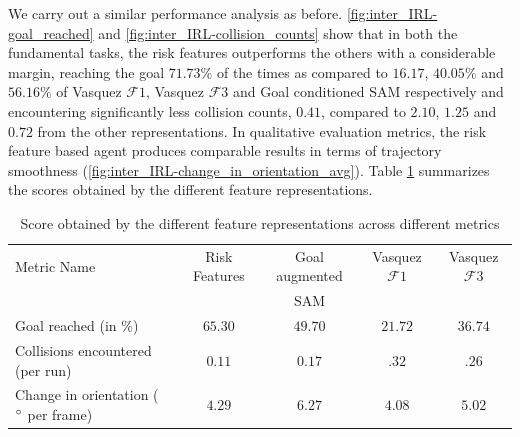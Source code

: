 We carry out a similar performance analysis as before. \autoref{fig:inter_IRL-goal_reached} and \autoref{fig:inter_IRL-collision_counts} show that in both the fundamental tasks, the risk features outperforms the others with a considerable margin, reaching the goal $71.73\%$ of the times as compared to $16.17$, $40.05\%$ and $56.16\%$ of Vasquez $\mathcal{F}1$, Vasquez $\mathcal{F}3$ and Goal conditioned SAM respectively and encountering significantly less collision counts, $0.41$, compared to $2.10$, $1.25$ and $0.72$ from the other  representations. In qualitative evaluation metrics, the risk feature based agent produces comparable results in terms of trajectory smoothness (\autoref{fig:inter_IRL-change_in_orientation_avg}). %
Table \ref{tab:inter_irl_numerical_comparison} summarizes the scores obtained by the different feature representations.
\begin{table}[htbp]
	\begin{center}
		\renewcommand{\arraystretch}{1.5}
		\begin{tabular}{|p{2.5cm}|c|c|c|c|}
			\hline
			Metric Name & Risk Features & Goal augmented  & Vasquez $\mathcal{F}1$ & Vasquez $\mathcal{F}3$\\
			  &   & SAM  &  &  \\
			\hline
			Goal reached (in $\%$) & $65.30$ & $49.70$ & $21.72$ & $36.74$ \\
			Collisions encountered (per run) & $0.11$ & $0.17$ & $.32$ & $.26$\\
			Change in orientation ( $\degree$ per frame) & $4.29$ & $6.27$ &  $4.08$ & $ 5.02$\\
			\hline
		\end{tabular}
	\end{center}
	\caption{Score obtained by the different feature representations across different metrics}
	\label{tab:inter_irl_numerical_comparison}
\end{table}\\


